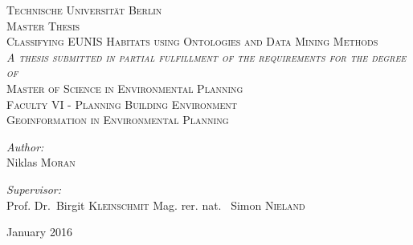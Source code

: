 \begin{titlepage}
\begin{center}

\textsc{\LARGE Technische Universit\"at Berlin}\\[0.5cm]
\textsc{Master Thesis}\\[1.5cm]

\textsc{\Large Classifying EUNIS Habitats using Ontologies and Data Mining
Methods}\\[1.5cm]
\textsc{\textit{A thesis submitted in partial fulfillment of the requirements
for the degree of}}\\[1.25cm]
\textsc{\Large Master of Science in Environmental Planning}\\[1.5cm]
\textsc{Faculty VI - Planning Building Environment\\
 Geoinformation in Environmental Planning}\\[1.5cm] 
\noindent
\begin{minipage}{0.5\textwidth}
\begin{flushleft} \large
\emph{Author:}\\
Niklas \textsc{Moran}
\end{flushleft}
\end{minipage}%
\begin{minipage}{0.5\textwidth}
\begin{flushright} \large
\emph{Supervisor:} \\
Prof. Dr.~Birgit \textsc{Kleinschmit}
Mag. rer. nat. ~Simon \textsc{Nieland}
\end{flushright}
\end{minipage}

\vfill

{\large January 2016}

\end{center}
\end{titlepage}
